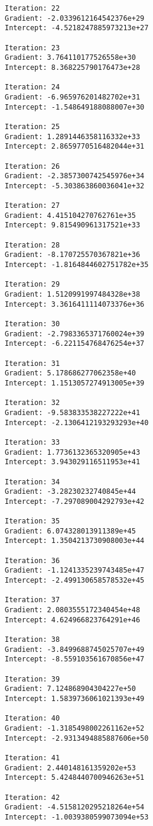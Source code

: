 \documentclass[11pt]{article}
\begin{document}
\begin{Verbatim}[commandchars=\\\{\}]
Iteration: 22 
Gradient: -2.0339612164542376e+29 
Intercept: -4.5218247885973213e+27 

Iteration: 23 
Gradient: 3.764110177526558e+30 
Intercept: 8.368225790176473e+28 

Iteration: 24 
Gradient: -6.965976201482702e+31 
Intercept: -1.548649188088007e+30 

Iteration: 25 
Gradient: 1.2891446358116332e+33 
Intercept: 2.8659770516482044e+31 

Iteration: 26 
Gradient: -2.3857300742545976e+34 
Intercept: -5.303863860036041e+32 

Iteration: 27 
Gradient: 4.415104270762761e+35 
Intercept: 9.815490961317521e+33 

Iteration: 28 
Gradient: -8.170725570367821e+36 
Intercept: -1.8164844602751782e+35 

Iteration: 29 
Gradient: 1.5120991997484328e+38 
Intercept: 3.3616411114073376e+36 

Iteration: 30 
Gradient: -2.7983365371760024e+39 
Intercept: -6.221154768476254e+37 

Iteration: 31 
Gradient: 5.178686277062358e+40 
Intercept: 1.1513057274913005e+39 

Iteration: 32 
Gradient: -9.583833538227222e+41 
Intercept: -2.1306412193293293e+40 

Iteration: 33 
Gradient: 1.7736132365320905e+43 
Intercept: 3.943029116511953e+41 

Iteration: 34 
Gradient: -3.28230232740845e+44 
Intercept: -7.297089004292793e+42 

Iteration: 35 
Gradient: 6.074328013911389e+45 
Intercept: 1.3504213730908003e+44 

Iteration: 36 
Gradient: -1.1241335239743485e+47 
Intercept: -2.499130658578532e+45 

Iteration: 37 
Gradient: 2.0803555172340454e+48 
Intercept: 4.624966823764291e+46 

Iteration: 38 
Gradient: -3.8499688745025707e+49 
Intercept: -8.559103561670856e+47 

Iteration: 39 
Gradient: 7.124868904304227e+50 
Intercept: 1.5839736061021393e+49 

Iteration: 40 
Gradient: -1.3185498002261162e+52 
Intercept: -2.9313494885887606e+50 

Iteration: 41 
Gradient: 2.440148161359202e+53 
Intercept: 5.4248440700946263e+51 

Iteration: 42 
Gradient: -4.5158120295218264e+54 
Intercept: -1.0039380599073094e+53 


\end{Verbatim}
\end{document}
